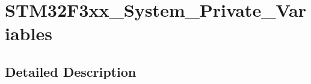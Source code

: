 \hypertarget{group___s_t_m32_f3xx___system___private___variables}{}\section{S\+T\+M32\+F3xx\+\_\+\+System\+\_\+\+Private\+\_\+\+Variables}
\label{group___s_t_m32_f3xx___system___private___variables}


\subsection{Detailed Description}
